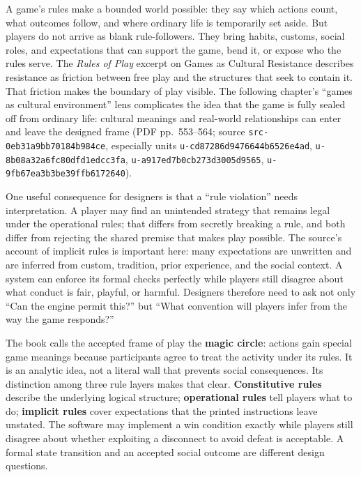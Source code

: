 A game's rules make a bounded world possible: they say which actions count, what outcomes follow, and where ordinary life is temporarily set aside. But players do not arrive as blank rule-followers. They bring habits, customs, social roles, and expectations that can support the game, bend it, or expose who the rules serve. The \emph{Rules of Play} excerpt on Games as Cultural Resistance describes resistance as friction between free play and the structures that seek to contain it. That friction makes the boundary of play visible. The following chapter's ``games as cultural environment'' lens complicates the idea that the game is fully sealed off from ordinary life: cultural meanings and real-world relationships can enter and leave the designed frame (PDF pp.~553--564; source \texttt{src-0eb31a9bb70184b984ce}, especially units \texttt{u-cd87286d9476644b6526e4ad}, \texttt{u-8b08a32a6fc80dfd1edcc3fa}, \texttt{u-a917ed7b0cb273d3005d9565}, \texttt{u-9fb67ea3b3be39ffb6172640}).

One useful consequence for designers is that a ``rule violation'' needs interpretation. A player may find an unintended strategy that remains legal under the operational rules; that differs from secretly breaking a rule, and both differ from rejecting the shared premise that makes play possible. The source's account of implicit rules is important here: many expectations are unwritten and are inferred from custom, tradition, prior experience, and the social context. A system can enforce its formal checks perfectly while players still disagree about what conduct is fair, playful, or harmful. Designers therefore need to ask not only ``Can the engine permit this?'' but ``What convention will players infer from the way the game responds?''

The book calls the accepted frame of play the \textbf{magic circle}: actions gain special game meanings because participants agree to treat the activity under its rules. It is an analytic idea, not a literal wall that prevents social consequences. Its distinction among three rule layers makes that clear. \textbf{Constitutive rules} describe the underlying logical structure; \textbf{operational rules} tell players what to do; \textbf{implicit rules} cover expectations that the printed instructions leave unstated. The software may implement a win condition exactly while players still disagree about whether exploiting a disconnect to avoid defeat is acceptable. A formal state transition and an accepted social outcome are different design questions.

